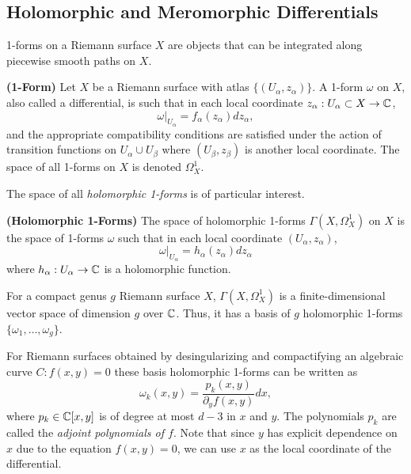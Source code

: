 \subsection{Holomorphic and Meromorphic
  Differentials}\label{subsec:background-holomorphic-and-meromorphic-differentials}

1-forms on a Riemann surface $X$ are objects that can be integrated along
piecewise smooth paths on $X$.
\begin{definition}
  {\bf (1-Form)} Let $X$ be a Riemann surface with atlas $\{ (U_\alpha,
  z_\alpha) \}$. A 1-form $\omega$ on $X$, also called a differential, is such
  that in each local coordinate $z_\alpha : U_\alpha \subset X \to \operatorname{\mathbb{C}}$,
  \[
    \omega \Big|_{U_\alpha} = f_\alpha(z_\alpha) dz_\alpha,
  \]
  and the appropriate compatibility conditions are satisfied under the action of
  transition functions on $U_\alpha \cup U_\beta$ where $(U_\beta, z_\beta)$ is
  another local coordinate. The space of all 1-forms on $X$ is denoted
  $\Omega_X^1$.
\end{definition}
The space of all {\it holomorphic 1-forms} is of particular interest.
\begin{definition}
  {\bf (Holomorphic 1-Forms)} The space of holomorphic 1-forms
  $\Gamma(X,\Omega_X^1)$ on $X$ is the space of 1-forms $\omega$ such that in
  each local coordinate $(U_\alpha, z_\alpha)$,
  \[
    \omega \Big|_{U_\alpha} = h_\alpha(z_\alpha) dz_\alpha
  \]
  where $h_\alpha : U_\alpha \to \operatorname{\mathbb{C}}$ is a holomorphic function.
\end{definition}
For a compact genus $g$ Riemann surface $X$, $\Gamma(X,\Omega_X^1)$ is a
finite-dimensional vector space of dimension $g$ over $\operatorname{\mathbb{C}}$. Thus, it has a
basis of $g$ holomorphic 1-forms $\{\omega_1, \ldots, \omega_g\}$.

For Riemann surfaces obtained by desingularizing and compactifying an algebraic
curve $C : f(x,y) = 0$ these basis holomorphic 1-forms can be written as
\begin{equation*}
  \omega_k(x,y) = \frac{p_k(x,y)}{\partial_y f(x,y)} dx,
\end{equation*}
where $p_k \in \operatorname{\mathbb{C}}[x,y]$ is of degree at most $d-3$ in $x$ and $y$. The
polynomials $p_k$ are called the {\it adjoint polynomials of $f$}. Note that
since $y$ has explicit dependence on $x$ due to the equation $f(x,y) = 0$, we
can use $x$ as the local coordinate of the differential.

